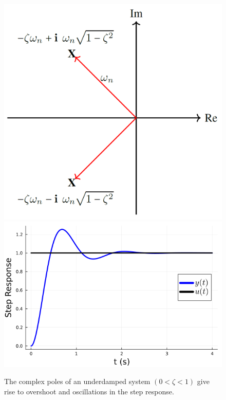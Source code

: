    
   
   
   

\bigskip

\begin{figure}[htb]
 \centering
    \includegraphics[width=.38\linewidth]{graphics/Chap10/UnderDampledPolesSecondOrder.png}
\hspace*{.2cm}
   \includegraphics[width=0.52\linewidth]{graphics/Chap10/UnderdampedStepResponse.png}
	\caption{The complex poles of an underdamped system $(0 < \zeta < 1)$ give rise to overshoot and oscillations in the step response. }
	\label{fig:TransientResponse:ComplexPoles}
\end{figure}


